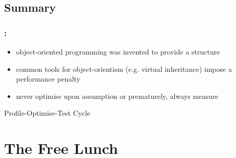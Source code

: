 \documentclass[9pt,xcolor=table]{beamer}
\begin{document}
\subsection{Summary}
\begin{frame}
\frametitle{\insertsectionhead{}: \insertsubsectionhead{}}

\begin{itemize}\large
\item object-oriented programming was invented to provide a structure
\item common tools for object-orientism (e.g. virtual inheritance) impose a performance penalty
\item never optimise upon assumption or prematurely, always measure
\end{itemize}

\begin{center}
  \huge Profile-Optimise-Test Cycle
\end{center}

\end{frame}

\section{The Free Lunch}
\end{document}
